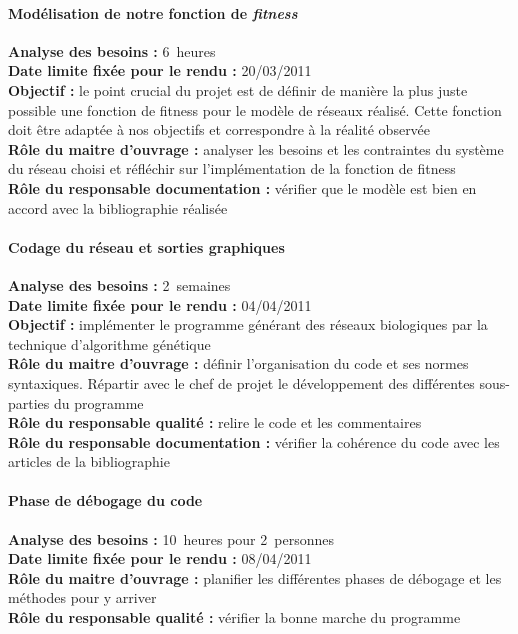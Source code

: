 \paragraph*{Modélisation de notre fonction de \textit{fitness}\\}
\textbf{Analyse des besoins : }6~heures\\
\textbf{Date limite fixée pour le rendu :} 20/03/2011\\
\textbf{Objectif : }le point crucial du projet est de définir de manière la plus juste possible une fonction de fitness pour le modèle de réseaux réalisé. Cette fonction doit être adaptée à nos objectifs et correspondre à la réalité observée\\
\textbf{Rôle du maitre d'ouvrage : }analyser les besoins et les contraintes du système du réseau choisi et réfléchir sur l'implémentation de la fonction de fitness\\
\textbf{Rôle du responsable documentation : }vérifier que le modèle est bien en accord avec la bibliographie réalisée

\paragraph*{Codage du réseau et sorties graphiques\\}
\textbf{Analyse des besoins : }2~semaines\\
\textbf{Date limite fixée pour le rendu : }04/04/2011\\
\textbf{Objectif : }implémenter le programme générant des réseaux biologiques par la technique d'algorithme génétique\\
\textbf{Rôle du maitre d'ouvrage : }définir l'organisation du code et ses normes syntaxiques. Répartir avec le chef de projet le développement des différentes sous-parties du programme\\
\textbf{Rôle du responsable qualité : }relire le code et les commentaires\\
\textbf{Rôle du responsable documentation : }vérifier la cohérence du code avec les articles de la bibliographie

\paragraph*{Phase de débogage du code\\}
\textbf{Analyse des besoins :} 10~heures pour 2~personnes\\
\textbf{Date limite fixée pour le rendu :} 08/04/2011\\
\textbf{Rôle du maitre d'ouvrage :} planifier les différentes phases de débogage et les méthodes pour y arriver\\
\textbf{Rôle du responsable qualité :} vérifier la bonne marche du programme

